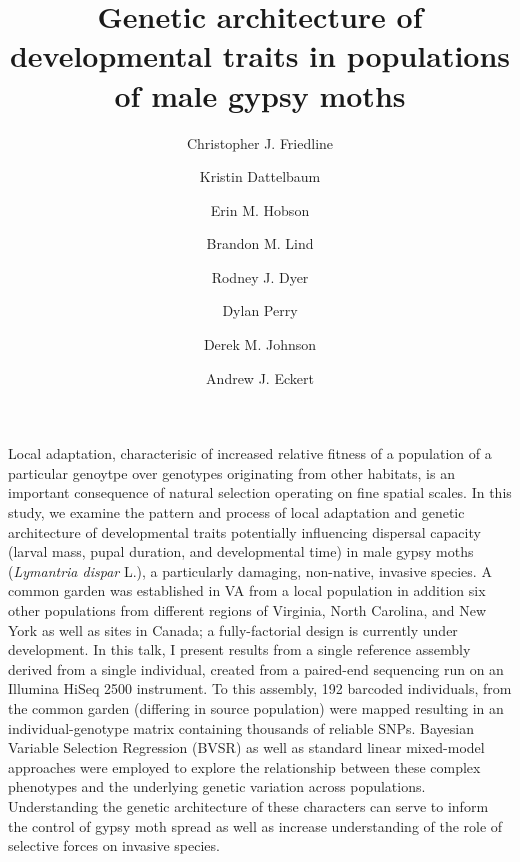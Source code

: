 \documentclass{article}
\date{}
\title{Genetic architecture of developmental traits in populations of male gypsy moths}
\author[1]{Christopher J. Friedline}
\author[1,2]{Kristin Dattelbaum}
\author[1]{Erin M. Hobson}
\author[1]{Brandon M. Lind}
\author[1]{Rodney J. Dyer}
\author[3]{Dylan Perry}
\author[1]{Derek M. Johnson}
\author[1]{Andrew J. Eckert}
\affil[1]{Department of Biology, Virginia Commonwealth University}
\affil[2]{Deparment of Biology, University of Richmond}
\affil[3]{College of Environmental Science \& Forestry, State University of New 
York}
\begin{document}
\maketitle

\label{sec:abstract}

Local adaptation, characterisic of increased relative fitness
of a population of a particular genoytpe over genotypes originating from
other habitats, is an important consequence of natural selection
operating on fine spatial scales.  In this study, we examine the
pattern and process of local adaptation and genetic architecture of
developmental traits potentially influencing dispersal capacity
(larval mass, pupal duration, and developmental time) in male gypsy
moths (\textit{Lymantria dispar} L.), a particularly damaging,
non-native, invasive species.  A common garden was established in VA
from a local population in addition six other populations from
different regions of Virginia, North Carolina, and New York as well as
sites in Canada; a fully-factorial design is currently under
development.  In this talk, I present results from a single reference
assembly derived from a single individual, created from a paired-end
sequencing run on an Illumina HiSeq 2500 instrument.  To this
assembly, 192 barcoded individuals, from the common garden (differing
in source population) were mapped resulting in an individual-genotype
matrix containing thousands of reliable SNPs.  Bayesian Variable
Selection Regression (BVSR) as well as standard linear mixed-model
approaches were employed to explore the relationship between these
complex phenotypes and the underlying genetic variation across
populations. Understanding the genetic architecture of these
characters can serve to inform the control of gypsy moth spread as
well as increase understanding of the role of selective forces on
invasive species.
\end{document}

